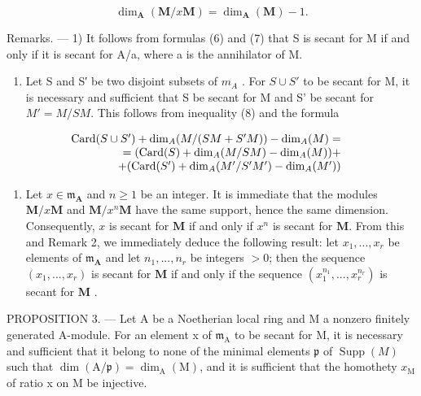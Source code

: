 \[
\dim_ {\mathbf {A}} (\mathbf {M} / x \mathbf {M}) = \dim_ {\mathbf {A}} (\mathbf {M}) - 1.
\]

Remarks. --- 1) It follows from formulas (6) and (7) that S is secant for M if and only if it is secant for A/a, where a is the annihilator of M.

\begin{enumerate}
\def\labelenumi{\arabic{enumi})}
\setcounter{enumi}{1}
\tightlist
\item
  Let S and S′ be two disjoint subsets of \(m_{A}\) . For \(S \cup S'\) to be secant for M, it is necessary and sufficient that S be secant for M and S' be secant for \(M' = M/SM\). This follows from inequality (8) and the formula
\end{enumerate}

\[
\begin{array}{r l} \operatorname{Card} (S \cup S ^ {\prime}) + \dim_ {A} (M / (S M + S ^ {\prime} M)) - \dim_ {A} (M) = & \\ = (\operatorname{Card} (S) + \dim_ {A} (M / S M) - \dim_ {A} (M)) + & \\ + (\operatorname{Card} (S ^ {\prime}) + \dim_ {A} (M ^ {\prime} / S ^ {\prime} M ^ {\prime}) - \dim_ {A} (M ^ {\prime})) \end{array}
\]

\begin{enumerate}
\def\labelenumi{\arabic{enumi})}
\setcounter{enumi}{2}
\tightlist
\item
  Let \(x \in \mathfrak{m}_{\mathbf{A}}\) and \(n \geqslant 1\) be an integer. It is immediate that the modules \(\mathbf{M} / x\mathbf{M}\) and \(\mathbf{M} / x^n\mathbf{M}\) have the same support, hence the same dimension. Consequently, \(x\) is secant for \(\mathbf{M}\) if and only if \(x^n\) is secant for \(\mathbf{M}\). From this and Remark 2, we immediately deduce the following result: let \(x_1, ..., x_r\) be elements of \(\mathfrak{m}_{\mathbf{A}}\) and let \(n_1, ..., n_r\) be integers \(> 0\); then the sequence \((x_1, ..., x_r)\) is secant for \(\mathbf{M}\) if and only if the sequence \((x_1^{n_1}, ..., x_r^{n_r})\) is secant for \(\mathbf{M}\) .
\end{enumerate}

PROPOSITION 3. --- Let A be a Noetherian local ring and M a nonzero finitely generated A-module. For an element x of \(\mathfrak{m}_{\mathrm{A}}\) to be secant for M, it is necessary and sufficient that it belong to none of the minimal elements \(\mathfrak{p}\) of \(\operatorname{Supp}(M)\) such that \(\dim(\mathrm{A}/\mathfrak{p}) = \dim_{\mathrm{A}}(\mathrm{M})\), and it is sufficient that the homothety \(x_{\mathrm{M}}\) of ratio x on M be injective.

